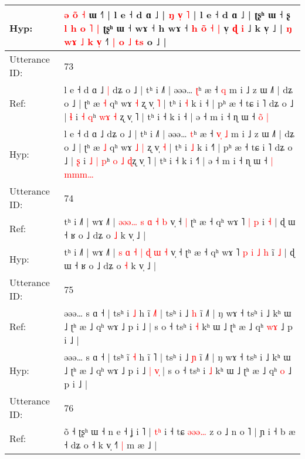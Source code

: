 \documentclass[10pt]{article}
\DeclareRobustCommand{\hl}[1]{{\textcolor{red}{#1}}}
\begin{document}
\begin{longtable}{ll}
 \\
Hyp: & \hl{}\hl{ə} \hl{}\hl{o}\hl{̃} \hl{˧} ɯ ˧\hl{˥} | l e ˧ d ɑ ˩ | \hl{ŋ} \hl{v}\hl{̩} \hl{˥} | l e ˧ d ɑ ˩ | ʈʂʰ ɯ ˧ ʂ \hl{l} \hl{h} \hl{o} \hl{}\hl{˥} \hl{|} ʈʂʰ ɯ ˧\hl{}\hl{} wɤ ˧ h wɤ ˧ \hl{h} \hl{o}\hl{̃} \hl{˧} \hl{|} v̩\hl{ }\hl{ɖ}\hl{ }\hl{i} ˩ k v̩ ˩ |\hl{ }\hl{ŋ}\hl{ }\hl{w}\hl{ɤ}\hl{ }\hl{˩} \hl{k} \hl{v}\hl{̩} ˧\hl{˥}\hl{ }\hl{|}\hl{ }\hl{o}\hl{ }\hl{˩} \hl{t}\hl{s} o ˩ |
 \\
\midrule
Utterance ID: & 73 \\
Ref: & l e ˧ d ɑ ˩\hl{ }\hl{|} dʑ o ˩ | tʰ i ˩˥ | əəə… \hl{ʈ}ʰ æ ˧\hl{}\hl{}\hl{} \hl{q} m i ˩ z ɯ ˩˥ | dʑ o ˩ | ʈʰ æ \hl{˧} qʰ wɤ\hl{}\hl{} \hl{˧} ʐ v̩ \hl{˥} | tʰ i \hl{˧} k i ˧\hl{} | pʰ æ ˧ tɕ i ˥ dʑ o ˩ | \hl{ɬ} i\hl{}\hl{} \hl{˧} \hl{q}ʰ \hl{w}\hl{ɤ} \hl{˧} \hl{}ʐ v̩ ˥ | tʰ i ˧ k i ˧\hl{} | ə ˧ m i ˧ ɳ ɯ ˧\hl{}\hl{} \hl{o}\hl{̃}\hl{ }\hl{|}
 \\
Hyp: & l e ˧ d ɑ ˩\hl{}\hl{} dʑ o ˩ | tʰ i ˩˥ | əəə… \hl{t}ʰ æ ˧\hl{ }\hl{v}\hl{̩} \hl{˩} m i ˩ z ɯ ˩˥ | dʑ o ˩ | ʈʰ æ \hl{˩} qʰ wɤ\hl{ }\hl{˩} \hl{|} ʐ v̩ \hl{˧} | tʰ i \hl{˩} k i ˧\hl{˥} | pʰ æ ˧ tɕ i ˥ dʑ o ˩ | \hl{ʂ} i\hl{ }\hl{˩} \hl{|} \hl{p}ʰ \hl{}\hl{o} \hl{˩} \hl{ɖ}ʐ v̩ ˥ | tʰ i ˧ k i ˧\hl{˥} | ə ˧ m i ˧ ɳ ɯ ˧\hl{ }\hl{|} \hl{m}\hl{m}\hl{m}\hl{…}
 \\
\midrule
Utterance ID: & 74 \\
Ref: & tʰ i ˩˥ | wɤ ˩˥ | \hl{}\hl{ə}\hl{ə}\hl{ə}\hl{…} \hl{s} \hl{ɑ} \hl{˧} \hl{b} v̩ ˧\hl{ }\hl{|} ʈʰ æ ˧ qʰ wɤ ˥\hl{}\hl{}\hl{}\hl{} \hl{|} \hl{p} i\hl{} \hl{˧} | ɖ ɯ ˧ ʁ o ˩ dʑ o \hl{˩} k v̩ ˩ |
 \\
Hyp: & tʰ i ˩˥ | wɤ ˩˥ | \hl{s}\hl{ }\hl{ɑ}\hl{ }\hl{˧} \hl{|} \hl{ɖ} \hl{ɯ} \hl{˧} v̩ ˧\hl{}\hl{} ʈʰ æ ˧ qʰ wɤ ˥\hl{ }\hl{p}\hl{ }\hl{i} \hl{˩} \hl{h} i\hl{̃} \hl{˩} | ɖ ɯ ˧ ʁ o ˩ dʑ o \hl{˧} k v̩ ˩ |
 \\
\midrule
Utterance ID: & 75 \\
Ref: & əəə… s ɑ ˧ | tsʰ i\hl{} \hl{˩} h ĩ \hl{˩}˥ | tsʰ i ˩ \hl{h} ĩ ˩˥ | ŋ wɤ ˧ tsʰ i ˩ kʰ ɯ ˩ ʈʰ æ ˩ qʰ wɤ ˩ p i ˩\hl{}\hl{}\hl{}\hl{}\hl{} | s o ˧ tsʰ i \hl{˧} kʰ ɯ ˩ ʈʰ æ ˩ qʰ \hl{w}\hl{ɤ} ˩ p i ˩ |
 \\
Hyp: & əəə… s ɑ ˧ | tsʰ i\hl{̃} \hl{˧} h ĩ \hl{}˥ | tsʰ i ˩ \hl{ɲ} ĩ ˩˥ | ŋ wɤ ˧ tsʰ i ˩ kʰ ɯ ˩ ʈʰ æ ˩ qʰ wɤ ˩ p i ˩\hl{ }\hl{|}\hl{ }\hl{v}\hl{̩} | s o ˧ tsʰ i \hl{˩} kʰ ɯ ˩ ʈʰ æ ˩ qʰ \hl{}\hl{o} ˩ p i ˩ |
 \\
\midrule
Utterance ID: & 76 \\
Ref: & õ ˧ ʈʂʰ ɯ ˧ n e ˧ ʝ i ˥ | \hl{t}\hl{ʰ} i ˧ tɕ\hl{}\hl{} \hl{}\hl{}\hl{ə}\hl{ə}\hl{ə}\hl{…} z o ˩ n o ˥ | ɲ i ˧ b æ ˧\hl{}\hl{} dʑ o ˧ k v̩ ˧\hl{˥}\hl{ }\hl{|} m æ ˩ |

\end{longtable}
\end{document}
